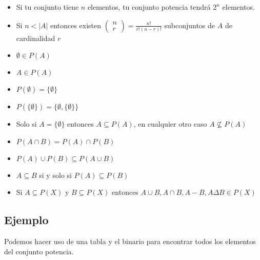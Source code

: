 \documentclass[12pt, fleqn]{report}                             %
\newcommand{\pVector}[1]{                                       %
        \ensuremath{\begin{pmatrix}#1\end{pmatrix}}                 %
    }
\begin{document}
                \begin{itemize}
                    \item Si tu conjunto tiene $n$ elementos, tu conjunto potencia tendrá
                        $2^n$ elementos.

                    \item Si $n < |A|$ entonces existen $\pVector{n\\r} = \frac{n!}{r!(n-r)!}$ 
                        subconjuntos de $A$ de cardinalidad $r$

                    \item $\emptyset \in P(A)$

                    \item $A \in P(A)$

                    \item $P(\emptyset) = \{\emptyset\}$

                    \item $P( \{\emptyset\}) = \{\emptyset, \{\emptyset\} \}$

                    \item Solo si $A = \{\emptyset\}$ entonces $A \subseteq P(A)$,
                        en cualquier otro caso $A \nsubseteq P(A)$

                    \item $P(A \cap B) = P(A) \cap P(B)$

                    \item $P(A) \cup P(B) \subseteq P(A \cup B)$

                    \item $A \subseteq B$ si y solo si  $P(A) \subseteq P(B)$ 

                    \item Si $A \subseteq P(X)$ y $B \subseteq P(X)$ entonces 
                    $A \cup B, A \cap B,  A - B,  A \Delta B \in P(X)$

                \end{itemize}



            \clearpage
            \subsection*{Ejemplo}

                Podemos hacer uso de una tabla y el binario para encontrar todos los
                elementos del conjunto potencia.
\end{document}
